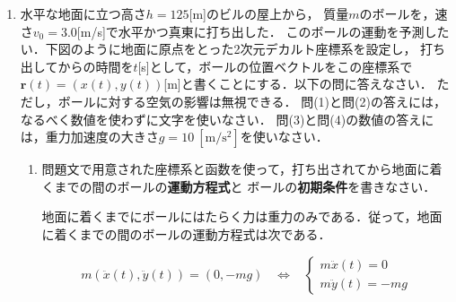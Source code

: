 \documentclass[a4paper,11pt]{ltjsarticle}
\begin{document}
\pagestyle{fancy}
\cfoot{\thepage}

\begin{enumerate}
    \item 水平な地面に立つ高さ$h=125$[m]のビルの屋上から，
    質量$m$のボールを，速さ$v_0=3.0$[m/s]で水平かつ真東に打ち出した．
    このボールの運動を予測したい．下図のように地面に原点をとった2次元デカルト座標系を設定し，
    打ち出してからの時間を$t$[s]として，ボールの位置ベクトルをこの座標系で
    $\bm{r}(t)=(x(t),y(t))$[m]と書くことにする．以下の問に答えなさい．
    ただし，ボールに対する空気の影響は無視できる．
    問(1)と問(2)の答えには，なるべく数値を使わずに文字を使いなさい．
    問(3)と問(4)の数値の答えには，重力加速度の大きさ$g=10\ [\mathrm{m/s^2}]$を使いなさい．

    \begin{center}
    \end{center}
    
    \begin{enumerate}[label=(\arabic*)]
        \item 問題文で用意された座標系と函数を使って，打ち出されてから地面に着くまでの間のボールの\textbf{運動方程式}と
        ボールの\textbf{初期条件}を書きなさい．

        \vspace{5pt}        

        地面に着くまでにボールにはたらく力は重力のみである．従って，地面に着くまでの間のボールの運動方程式は次である．

        \begin{equation*}
            m(\ddot{x}(t),\ddot{y}(t))=(0,-mg) \hspace{10pt} \Leftrightarrow \hspace{10pt}
            \begin{cases}
                m \ddot{x}(t)=0 \\
                m \ddot{y}(t)=-mg
            \end{cases}
        \end{equation*}


\end{enumerate}
\end{enumerate}
\end{document}
